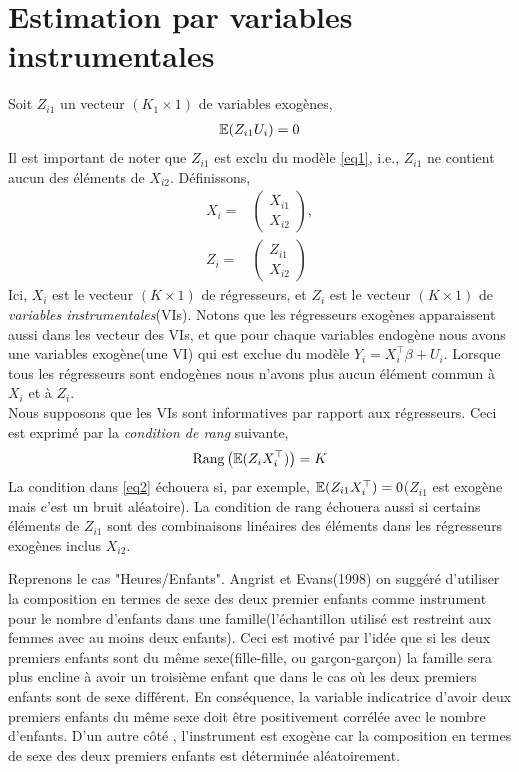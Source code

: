 \documentclass[12pt, reqno]{amsart}
\begin{document}
\section{Estimation par variables instrumentales}
Soit $Z_{i1}$ un vecteur $(K_1\times 1)$ de variables exogènes,
\begin{align*}
\mathbb{E}(Z_{i1}U_i) = 0
\end{align*}
Il est important de noter que  $Z_{i1}$ est exclu du modèle \eqref{eq1}, i.e., $Z_{i1}$ ne contient aucun des éléments de $X_{i2}$. Définissons,
\begin{align*}
X_i =&\left(
\begin{array}{c}
X_{i1}\\
X_{i2}
\end{array}
\right),
\\
Z_i =&\left(
\begin{array}{c}
Z_{i1}\\
X_{i2}
\end{array}
\right)
\end{align*}
Ici, $X_i$ est le vecteur $(K\times 1)$ de régresseurs, et $Z_i$ est le vecteur $(K\times 1)$ de \emph{variables instrumentales}(VIs). Notons que les régresseurs exogènes apparaissent aussi dans les vecteur des VIs, et que pour chaque variables endogène nous avons une variables exogène(une VI) qui est exclue du modèle $Y_i = X_i^\top\beta +U_i$. Lorsque tous les régresseurs sont endogènes nous n'avons plus aucun élément commun à $X_i$ et à $Z_i$. \\
Nous supposons que les VIs sont informatives par rapport aux régresseurs. Ceci est exprimé par la \emph{condition de rang} suivante,
\begin{align}
\mathrm{Rang}\left(\mathbb{E}(Z_iX_i^\top)\right) = K
\label{eq2}
\end{align}
La condition dans \eqref{eq2} échouera si, par exemple, $\mathbb{E}(Z_{i1}X_i^\top) = 0$($Z_{i1}$ est exogène mais c'est un bruit aléatoire). La condition de rang échouera aussi si certains éléments de $Z_{i1}$ sont des combinaisons linéaires des éléments dans les régresseurs exogènes inclus $X_{i2}$.
\begin{exemple}
Reprenons le cas "Heures/Enfants". Angrist et Evans(1998) on suggéré d'utiliser la composition en termes de sexe des deux premier enfants  comme instrument pour le nombre d'enfants dans une famille(l'échantillon utilisé est restreint  aux femmes avec au moins deux enfants). Ceci est motivé par l'idée que si les deux premiers enfants sont du même sexe(fille-fille, ou garçon-garçon) la famille sera plus encline à avoir un troisième enfant que dans le cas où les deux premiers enfants sont de sexe différent. En conséquence, la variable indicatrice d'avoir deux premiers enfants du même sexe doit être positivement corrélée avec le nombre d'enfants. D'un autre côté , l'instrument est exogène car la composition en termes de sexe des deux premiers enfants est déterminée aléatoirement.
\end{exemple}
\end{document}
